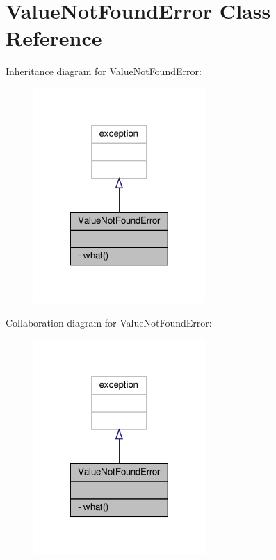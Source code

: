 \hypertarget{classValueNotFoundError}{}\section{Value\+Not\+Found\+Error Class Reference}
\label{classValueNotFoundError}


Inheritance diagram for Value\+Not\+Found\+Error\+:
\nopagebreak
\begin{figure}[H]
\begin{center}
\leavevmode
\includegraphics[width=185pt]{classValueNotFoundError__inherit__graph}
\end{center}
\end{figure}


Collaboration diagram for Value\+Not\+Found\+Error\+:
\nopagebreak
\begin{figure}[H]
\begin{center}
\leavevmode
\includegraphics[width=185pt]{classValueNotFoundError__coll__graph}
\end{center}
\end{figure}
